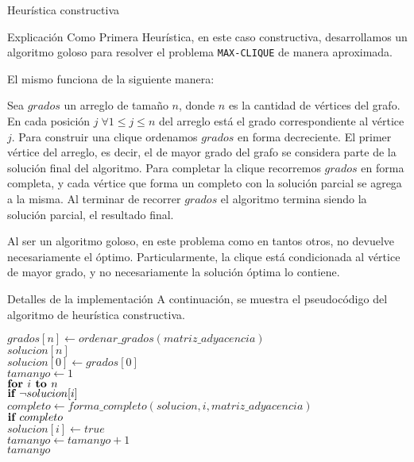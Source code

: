 \begin{section}{Heurística constructiva}
		\begin{subsection}{Explicación}
			Como Primera Heurística, en este caso constructiva, desarrollamos un algoritmo goloso para resolver el problema \texttt{MAX-CLIQUE} de manera aproximada.
			
			El mismo funciona de la siguiente manera:

			Sea $grados$ un arreglo de tamaño $n$, donde $n$ es la cantidad de vértices del grafo. En cada posición $j\; \forall 	1\leq j \leq n$ del arreglo está el grado correspondiente al vértice $j$.
			Para construir una clique ordenamos $grados$ en forma decreciente. El primer vértice del arreglo, es decir, el de mayor grado del grafo se considera parte de la solución final del algoritmo.
			Para completar la clique recorremos $grados$ en forma completa, y cada vértice que forma un completo con la solución parcial se agrega a la misma.
			Al terminar de recorrer $grados$ el algoritmo termina siendo la solución parcial, el resultado final.

			Al ser un algoritmo goloso, en este problema como en tantos otros, no devuelve necesariamente el óptimo. Particularmente, la clique está condicionada al vértice de mayor grado, y no necesariamente la solución óptima lo contiene.\VSP
		\end{subsection}
		\begin{subsection}{Detalles de la implementación}
			A continuación, se muestra el pseudocódigo del algoritmo de heurística constructiva.\\

			\begin{pseudo}
				\tab $grados[n] \leftarrow ordenar\_grados(matriz\_adyacencia)$\\
				\tab $solucion[n]$\\
				\tab $solucion[0] \leftarrow grados[0]$\\
				\tab $tamanyo \leftarrow 1$\\
				\tab $\textbf{for } i \textbf{ to } n$\\
				\tab \tab $\textbf{if } \neg solucion[i]$\\
				\tab \tab \tab $completo \leftarrow forma\_completo(solucion,i,matriz\_adyacencia)$\\
				\tab \tab \tab $\textbf{if } completo$\\
				\tab \tab \tab \tab $solucion[i] \leftarrow true$\\
				\tab \tab \tab \tab $tamanyo \leftarrow tamanyo + 1$\\
				\RET $tamanyo$\\
			\end{pseudo}


\end{subsection}
\end{section}
